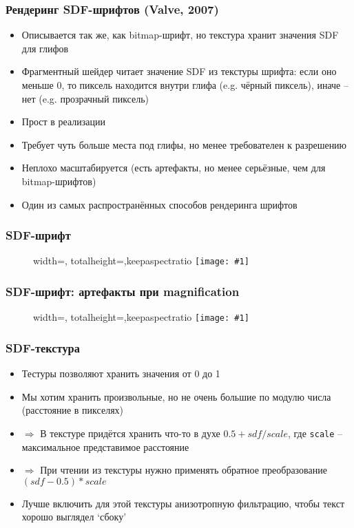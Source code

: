 \documentclass{beamer}
\newcommand{\slideimage}[1]{
  \begin{figure}
    \begin{adjustbox}{width=\textwidth, totalheight=\textheight-2\baselineskip-2\baselineskip,keepaspectratio}
      \texttt{[image: \#1]}
    \end{adjustbox}
  \end{figure}
}
\begin{document}
\begin{frame}[fragile]
\frametitle{Рендеринг SDF-шрифтов (Valve, 2007)}
\begin{itemize}
\item Описывается так же, как bitmap-шрифт, но текстура хранит значения SDF для глифов
\pause
\item Фрагментный шейдер читает значение SDF из текстуры шрифта: если оно меньше 0, то пиксель находится внутри глифа (e.g. чёрный пиксель), иначе -- нет (e.g. прозрачный пиксель)
\pause
\item Прост в реализации
\pause
\item Требует чуть больше места под глифы, но менее требователен к разрешению
\pause
\item Неплохо масштабируется (есть артефакты, но менее серьёзные, чем для bitmap-шрифтов)
\pause
\item Один из самых распространённых способов рендеринга шрифтов
\end{itemize}
\end{frame}

\begin{frame}[fragile]
\frametitle{SDF-шрифт}
\slideimage{sdf-font.png}
\end{frame}

\begin{frame}[fragile]
\frametitle{SDF-шрифт: артефакты при magnification}
\slideimage{sdf-artifacts.jpg}
\end{frame}

\begin{frame}[fragile]
\frametitle{SDF-текстура}
\begin{itemize}
\item Тестуры позволяют хранить значения от 0 до 1
\pause
\item Мы хотим хранить произвольные, но не очень большие по модулю числа (расстояние в пикселях)
\pause
\item \begin{math}\Rightarrow\end{math} В текстуре придётся хранить что-то в духе \begin{math}0.5 + sdf / scale\end{math}, где \verb|scale| -- максимальное представимое расстояние
\pause
\item \begin{math}\Rightarrow\end{math} При чтении из текстуры нужно применять обратное преобразование \begin{math}(sdf - 0.5) * scale\end{math}
\pause
\item Лучше включить для этой текстуры анизотропную фильтрацию, чтобы текст хорошо выглядел `сбоку'
\end{itemize}
\end{frame}
\end{document}
